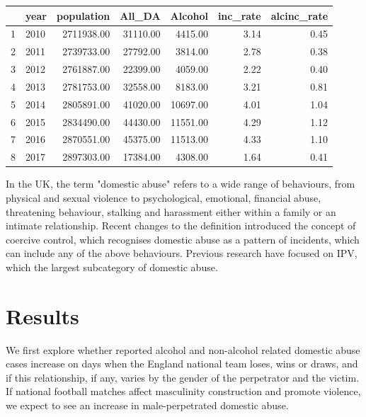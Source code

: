 \documentclass[12pt, letterpaper]{article}
\begin{document}


\begin{table}[ht]
\centering
\begin{tabular}{rlrrrrr}
  \hline
 & year & population & All\_DA & Alcohol & inc\_rate & alcinc\_rate \\ 
  \hline
1 & 2010 & 2711938.00 & 31110.00 & 4415.00 & 3.14 & 0.45 \\ 
  2 & 2011 & 2739733.00 & 27792.00 & 3814.00 & 2.78 & 0.38 \\ 
  3 & 2012 & 2761887.00 & 22399.00 & 4059.00 & 2.22 & 0.40 \\ 
  4 & 2013 & 2781753.00 & 32558.00 & 8183.00 & 3.21 & 0.81 \\ 
  5 & 2014 & 2805891.00 & 41020.00 & 10697.00 & 4.01 & 1.04 \\ 
  6 & 2015 & 2834490.00 & 44430.00 & 11551.00 & 4.29 & 1.12 \\ 
  7 & 2016 & 2870551.00 & 45375.00 & 11513.00 & 4.33 & 1.10 \\ 
  8 & 2017 & 2897303.00 & 17384.00 & 4308.00 & 1.64 & 0.41 \\ 
   \hline
\end{tabular}
\end{table}

In the UK, the term "domestic abuse" refers to a wide range of behaviours, from physical and sexual violence to psychological, emotional, financial abuse, threatening behaviour, stalking and harassment either within a family or an intimate relationship\autocite{ONS}. Recent changes to the definition introduced the concept of coercive control, which recognises domestic abuse as a pattern of incidents, which can include any of the above behaviours. Previous research have focused on IPV, which the largest subcategory of domestic abuse. 

\section{Results}

We first explore whether reported alcohol and non-alcohol related domestic abuse cases increase on days when the England national team loses, wins or draws, and if this relationship, if any, varies by the gender of the perpetrator and the victim. If national football matches affect masculinity construction and promote violence, we expect to see an increase in male-perpetrated domestic abuse.
\end{document}

